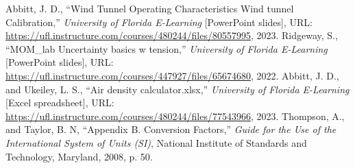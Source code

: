 \documentclass[journal,letterpaper]{IEEEtran}
\begin{document}
\begin{thebibliography}{9}
     Abbitt, J. D., ``Wind Tunnel Operating Characteristics
    Wind tunnel Calibration,'' \textit{University of Florida E-Learning} [PowerPoint slides], URL: \url{https://ufl.instructure.com/courses/480244/files/80557995}, 2023.
     Ridgeway, S., ``MOM\_lab Uncertainty basics w tension,'' \textit{University of Florida E-Learning} [PowerPoint slides], URL: \url{https://ufl.instructure.com/courses/447927/files/65674680}, 2022.
     Abbitt, J. D., and Ukeiley, L. S., ``Air density calculator.xlsx,'' \textit{University of Florida E-Learning} [Excel spreadsheet], URL: \url{https://ufl.instructure.com/courses/480244/files/77543966}, 2023.
     Thompson, A., and Taylor, B. N, ``Appendix B. Conversion Factors,'' \textit{Guide for the Use of the International System of Units (SI)}, National Institute of Standards and Technology, Maryland, 2008, p. 50.
\end{thebibliography}
\end{document}
